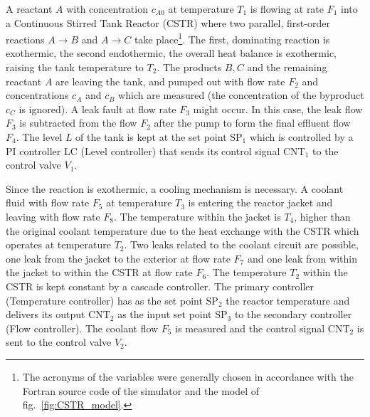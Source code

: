 \documentclass[10pt, conference, compsocconf]{IEEEtran}
\newcommand{\reffig}[1]{fig.~\ref{fig:#1}}
\begin{document}
A reactant $A$ with concentration $c_{A0}$ at temperature $T_{1}$ is
flowing at rate $F_{1}$ into a Continuous Stirred Tank Reactor (CSTR)
where two parallel, first-order reactions
$A\rightarrow B$ and $A\rightarrow C$ take place\footnote{The acronyms
of the variables were generally chosen in
accordance with the Fortran source code of the simulator and the model
of \reffig{CSTR_model}.}.
The first, dominating reaction is exothermic, the second endothermic,
the overall heat balance is exothermic, raising the tank
temperature to $T_{2}$.
The products $B,C$ and the remaining reactant $A$ are leaving the
tank, and pumped out with flow rate $F_{2}$ and concentrations
$c_{A}$ and $c_{B}$ which are measured (the concentration
of the byproduct $c_{C}$ is ignored). A leak fault at
flow rate $F_{3}$ might occur. In this case, the leak flow $F_{3}$
is subtracted from the flow $F_{2}$ after the pump to form the
final effluent flow $F_{4}$.
The level $L$ of the tank
is kept at the set point $\text{SP}_{1}$ which is controlled
by a PI controller LC (Level controller) that sends its control signal
$\text{CNT}_{1}$ to the control valve $V_{1}$.

Since the reaction is exothermic, a cooling mechanism is necessary.
A coolant fluid with flow rate $F_{5}$ at temperature $T_{3}$
is entering the reactor jacket and leaving with flow rate $F_{8}$.
The temperature within the jacket is $T_{4}$, higher than the
original coolant temperature due to the heat exchange with the
CSTR which operates at temperature $T_{2}$.
Two leaks related to the coolant circuit are possible,
one leak from the jacket to the exterior at flow rate
$F_{7}$ and one leak from within the jacket to within the
CSTR at flow rate $F_{6}$.
The temperature $T_{2}$ within the CSTR is kept constant
by a cascade controller. The primary controller (Temperature controller)
has as the set point $\text{SP}_{2}$ the reactor temperature and
delivers its output $\text{CNT}_{2}$ as the input set point $\text{SP}_{3}$
to the secondary controller (Flow controller).
The coolant flow $F_{5}$ is measured and the
control signal $\text{CNT}_{2}$ is sent to the control valve $V_{2}$.
\end{document}
